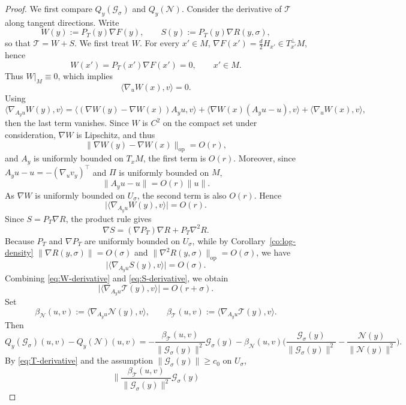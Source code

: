 \documentclass[11pt]{article}
\theoremstyle{plain}
\theoremstyle{definition}
\begin{document}
\begin{proof}
We first compare $Q_y(\mathcal G_\sigma)$ and $Q_y(\mathcal N)$. Consider the derivative of $\mathcal T$ along tangent directions. Write
\[
W(y):=P_T(y)\nabla F(y),
\qquad
S(y):=P_T(y)\nabla R(y,\sigma),
\]
so that $\mathcal T=W+S$.
We first treat $W$. For every $x'\in M$, $\nabla F(x')=\frac d2 H_{x'}\in T_{x'}^\perp M$, hence
\[
W(x')=P_T(x')\nabla F(x')=0,
\qquad x'\in M.
\]
Thus $W|_M\equiv 0$, which implies
\[
\langle \nabla_u W(x),v\rangle=0.
\]
Using
\[
\langle \nabla_{A_yu}W(y),v\rangle
=
\langle (\nabla W(y)-\nabla W(x))A_yu,v\rangle
+
\langle \nabla W(x)(A_yu-u),v\rangle
+
\langle \nabla_uW(x),v\rangle,
\]
then the last term vanishes. Since $W$ is $C^2$ on the compact set under consideration, $\nabla W$ is Lipschitz, and thus
\[
\|\nabla W(y)-\nabla W(x)\|_{\mathrm{op}}=O(r),
\]
and $A_y$ is uniformly bounded on $T_xM$, the first term is $O(r)$.
Moreover, since $A_yu-u=-(\nabla_u v_y)^\top$ and $\Pi$ is uniformly bounded on $M$,
\[
\|A_yu-u\|=O(r)\|u\|.
\]
As $\nabla W$ is uniformly bounded on $U_\sigma$, the second term is also
$O(r)$. Hence
\begin{equation}\label{eq:W-derivative}
\big|\langle \nabla_{A_yu}W(y),v\rangle\big|
=O(r).
\end{equation}
Since $S=P_T\nabla R$, the product rule gives
\[
\nabla S=(\nabla P_T)\nabla R + P_T\nabla^2R.
\]
Because $P_T$ and $\nabla P_T$ are uniformly bounded on $U_\sigma$, while by Corollary~\ref{co:log-density} $\|\nabla R(y,\sigma)\|=O(\sigma)$ and $\|\nabla^2R(y,\sigma)\|_{\mathrm{op}} = O(\sigma)$, we have  
\begin{equation}\label{eq:S-derivative}
\big|\langle \nabla_{A_yu}S(y),v\rangle\big|
=O(\sigma).
\end{equation}
Combining \eqref{eq:W-derivative} and \eqref{eq:S-derivative}, we obtain
\begin{equation}\label{eq:T-derivative}
\big|\langle \nabla_{A_yu}\mathcal T(y),v\rangle\big|
=O(r+\sigma).
\end{equation}
Set
\[
\beta_{\mathcal N}(u,v):=\langle \nabla_{A_yu}\mathcal N(y),v\rangle,
\qquad
\beta_{\mathcal T}(u,v):=\langle \nabla_{A_yu}\mathcal T(y),v\rangle.
\]
Then
\[
Q_y(\mathcal G_\sigma)(u,v)-Q_y(\mathcal N)(u,v)
=
-\frac{\beta_{\mathcal T}(u,v)}{\|\mathcal G_\sigma(y)\|^2}\mathcal G_\sigma(y)
-\beta_{\mathcal N}(u,v)
\big(
\frac{\mathcal G_\sigma(y)}{\|\mathcal G_\sigma(y)\|^2}
-
\frac{\mathcal N(y)}{\|\mathcal N(y)\|^2}
\big).
\]
By \eqref{eq:T-derivative} and the assumption
$\|\mathcal G_\sigma(y)\|\ge c_0$ on $U_\sigma$,
\[
\Big\|
\frac{\beta_{\mathcal T}(u,v)}{\|\mathcal G_\sigma(y)\|^2}\mathcal G_\sigma(y)
\]
\end{proof}
\end{document}
